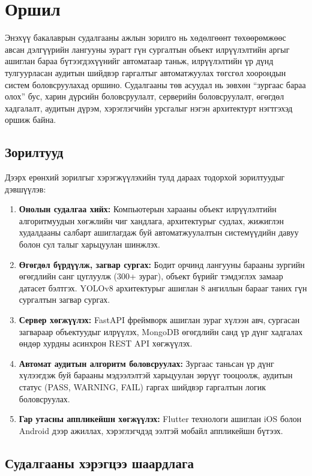 \chapter{Оршил}

Энэхүү бакалаврын судалгааны ажлын зорилго нь хөдөлгөөнт төхөөрөмжөөс авсан дэлгүүрийн лангууны зурагт гүн сургалтын объект илрүүлэлтийн аргыг ашиглан бараа бүтээгдэхүүнийг автоматаар таньж, илрүүлэлтийн үр дүнд тулгуурласан аудитын шийдвэр гаргалтыг автоматжуулах төгсгөл хоорондын систем боловсруулахад оршино. Судалгааны төв асуудал нь зөвхөн ``зургаас бараа олох'' бус, харин дүрсийн боловсруулалт, серверийн боловсруулалт, өгөгдөл хадгалалт, аудитын дүрэм, хэрэглэгчийн урсгалыг нэгэн архитектурт нэгтгэхэд оршиж байна.

\section{Зорилтууд}

Дээрх ерөнхий зорилгыг хэрэгжүүлэхийн тулд дараах тодорхой зорилтуудыг дэвшүүлэв:

\begin{enumerate}
\item \textbf{Онолын судалгаа хийх:} Компьютерын харааны объект илрүүлэлтийн алгоритмуудын хөгжлийн чиг хандлага, архитектурыг судлах, жижиглэн худалдааны салбарт ашиглагдаж буй автоматжуулалтын системүүдийн давуу болон сул талыг харьцуулан шинжлэх.
\item \textbf{Өгөгдөл бүрдүүлж, загвар сургах:} Бодит орчинд лангууны барааны зургийн өгөгдлийн санг цуглуулж (300+ зураг), объект бүрийг тэмдэглэх замаар датасет бэлтгэх. YOLOv8 архитектурыг ашиглан 8 ангиллын барааг таних гүн сургалтын загвар сургах.
\item \textbf{Сервер хөгжүүлэх:} FastAPI фреймворк ашиглан зураг хүлээн авч, сургасан загвараар объектуудыг илрүүлэх, MongoDB өгөгдлийн санд үр дүнг хадгалах өндөр хурдны асинхрон REST API хөгжүүлэх.
\item \textbf{Автомат аудитын алгоритм боловсруулах:} Зургаас таньсан үр дүнг хүлээгдэж буй барааны мэдээлэлтэй харьцуулан зөрүүг тооцоолж, аудитын статус (PASS, WARNING, FAIL) гаргах шийдвэр гаргалтын логик боловсруулах.
\item \textbf{Гар утасны аппликейшн хөгжүүлэх:} Flutter технологи ашиглан iOS болон Android дээр ажиллах, хэрэглэгчдэд ээлтэй мобайл аппликейшн бүтээх.
\end{enumerate}

\section{Судалгааны хэрэгцээ шаардлага}

